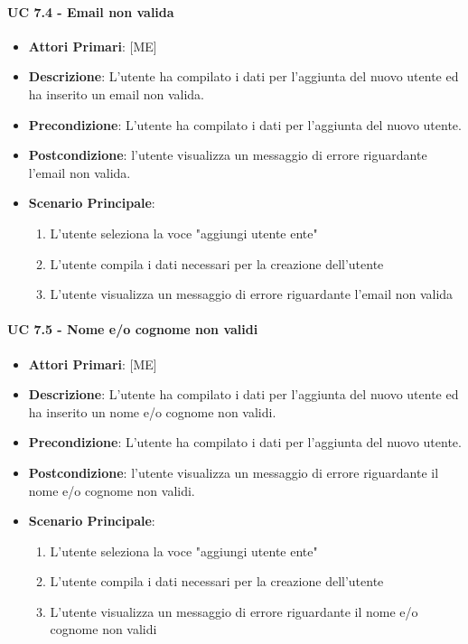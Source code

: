 			\paragraph{UC 7.4 - Email non valida}
			\begin{itemize}
				\item \textbf{Attori Primari}: [ME]
				\item \textbf{Descrizione}: L'utente ha compilato i dati per l'aggiunta del nuovo utente ed ha inserito un email non valida.
				\item \textbf{Precondizione}: L'utente ha compilato i dati per l'aggiunta del nuovo utente.
				\item \textbf{Postcondizione}: l'utente visualizza un messaggio di errore riguardante l'email non valida.
				\item \textbf{Scenario Principale}:
				\begin{enumerate}
					\item{L'utente seleziona la voce "aggiungi utente ente"}
					\item{L'utente compila i dati necessari per la creazione dell'utente}
					\item{L'utente visualizza un messaggio di errore riguardante l'email non valida}
				\end{enumerate}	
			\end{itemize}
			
			\paragraph{UC 7.5 - Nome e/o cognome non validi}
			\begin{itemize}
				\item \textbf{Attori Primari}: [ME]
				\item \textbf{Descrizione}: L'utente ha compilato i dati per l'aggiunta del nuovo utente ed ha inserito un nome e/o cognome non validi.
				\item \textbf{Precondizione}: L'utente ha compilato i dati per l'aggiunta del nuovo utente.
				\item \textbf{Postcondizione}: l'utente visualizza un messaggio di errore riguardante il nome e/o cognome non validi.
				\item \textbf{Scenario Principale}:
				\begin{enumerate}
					\item{L'utente seleziona la voce "aggiungi utente ente"}
					\item{L'utente compila i dati necessari per la creazione dell'utente}
					\item{L'utente visualizza un messaggio di errore riguardante il nome e/o cognome non validi}
				\end{enumerate}	
			\end{itemize}
			
